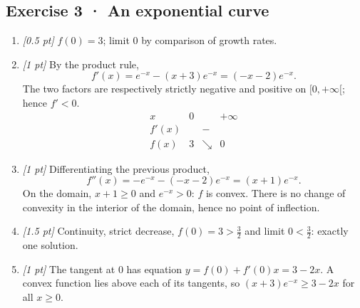 \subsection*{Exercise 3 · An exponential curve}\begin{enumerate}

\item \textit{[0.5 pt]} $f(0)=3$; limit $0$ by comparison of growth rates.

\item \textit{[1 pt]} By the product rule,
\[f'(x)=e^{-x}-(x+3)e^{-x}=(-x-2)e^{-x}.\]
The two factors are respectively strictly negative and positive on $[0,+\infty[$; hence $f'<0$.
\[\begin{array}{c|ccc}x&0&&+\infty\\\hline f'(x)&&-&\\\hline f(x)&3&\searrow&0\end{array}\]

\item \textit{[1 pt]} Differentiating the previous product,
\[f''(x)=-e^{-x}-(-x-2)e^{-x}=(x+1)e^{-x}.\]
On the domain, $x+1\ge0$ and $e^{-x}>0$: $f$ is convex. There is no change of convexity in the interior of the domain, hence no point of inflection.

\item \textit{[1.5 pt]} Continuity, strict decrease, $f(0)=3>\frac{3}{2}$ and limit $0<\frac{3}{2}$: exactly one solution.

\item \textit{[1 pt]} The tangent at $0$ has equation $y=f(0)+f'(0)x=3-2x$. A convex function lies above each of its tangents, so $(x+3)e^{-x}\ge 3-2x$ for all $x\ge0$.

\end{enumerate}

